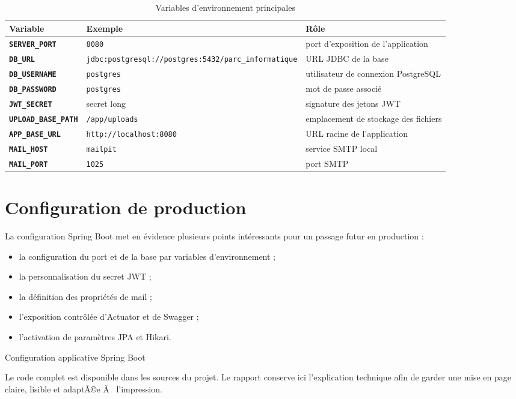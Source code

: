 ﻿\documentclass[12pt,a4paper,oneside]{report}
\newenvironment{codeblock}[1][]{
  \par
  \captionsetup{type=figure}
}{
  \par
}
\begin{document}
\begin{table}[H]
\centering
\caption{Variables d'environnement principales}
\label{tab:variables-env}
\begin{tabularx}{\textwidth}{>{\bfseries}p{3.7cm}p{3cm}X}
\toprule
Variable & Exemple & Rôle \\
\midrule
\texttt{SERVER\_PORT} & \texttt{8080} & port d'exposition de l'application \\
\texttt{DB\_URL} & \texttt{jdbc:postgresql://postgres:5432/parc\_informatique} & URL JDBC de la base \\
\texttt{DB\_USERNAME} & \texttt{postgres} & utilisateur de connexion PostgreSQL \\
\texttt{DB\_PASSWORD} & \texttt{postgres} & mot de passe associé \\
\texttt{JWT\_SECRET} & secret long & signature des jetons JWT \\
\texttt{UPLOAD\_BASE\_PATH} & \texttt{/app/uploads} & emplacement de stockage des fichiers \\
\texttt{APP\_BASE\_URL} & \texttt{http://localhost:8080} & URL racine de l'application \\
\texttt{MAIL\_HOST} & \texttt{mailpit} & service SMTP local \\
\texttt{MAIL\_PORT} & \texttt{1025} & port SMTP \\
\bottomrule
\end{tabularx}
\end{table}

\section{Configuration de production}
La configuration Spring Boot met en évidence plusieurs points intéressants pour un passage futur en production :
\begin{itemize}
  \item la configuration du port et de la base par variables d'environnement ;
  \item la personnalisation du secret JWT ;
  \item la définition des propriétés de mail ;
  \item l'exposition contrôlée d'Actuator et de Swagger ;
  \item l'activation de paramètres JPA et Hikari.
\end{itemize}

\begin{codeblock}[H]
\caption{Configuration applicative Spring Boot}
\begin{keybox}
Le code complet est disponible dans les sources du projet. Le rapport conserve ici l'explication technique afin de garder une mise en page claire, lisible et adaptÃ©e Ã  l'impression.
\end{keybox}
\end{codeblock}
\end{document}
